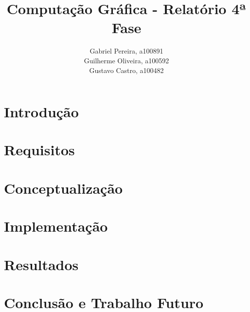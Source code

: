 \documentclass[a4paper,12pt]{article}
\title{\textbf{Computação Gráfica - Relatório 4ª Fase}}
\author{Gabriel Pereira, a100891\\
                Guilherme Oliveira, a100592\\
                Gustavo Castro, a100482}
\begin{document}
\begin{titlepage}
        \maketitle
\end{titlepage}


\section{Introdução}


\section{Requisitos}


\section{Conceptualização}


\section{Implementação}


\section{Resultados}


\section{Conclusão e Trabalho Futuro}


\end{document}
